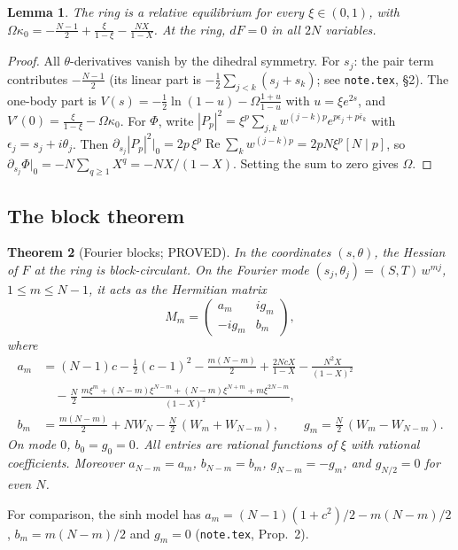 \documentclass[11pt]{article}
\newtheorem{theorem}{Theorem}
\newtheorem{lemma}[theorem]{Lemma}
\theoremstyle{remark}
\begin{document}
\begin{lemma}\label{lem:re}
The ring is a relative equilibrium for every $\xi\in(0,1)$, with
$\displaystyle \Omega\kappa_0=-\frac{N-1}2+\frac{\xi}{1-\xi}-\frac{NX}{1-X}$.
At the ring, $dF=0$ in all $2N$ variables.
\end{lemma}
\begin{proof}
All $\theta$-derivatives vanish by the dihedral symmetry. For $s_j$: the pair term contributes
$-\frac{N-1}2$ (its linear part is $-\frac12\sum_{j<k}(s_j+s_k)$; see \texttt{note.tex}, \S2). The one-body part is
$V(s)=-\frac12\ln(1-u)-\Omega\frac{1+u}{1-u}$ with $u=\xi e^{2s}$, and $V'(0)=\frac{\xi}{1-\xi}-\Omega\kappa_0$. For $\Phi$, write
$|P_p|^2=\xi^p\sum_{j,k}w^{(j-k)p}e^{p\epsilon_j+p\bar\epsilon_k}$ with $\epsilon_j=s_j+i\theta_j$. Then
$\partial_{s_j}|P_p|^2\big|_0=2p\,\xi^p\operatorname{Re}\sum_kw^{(j-k)p}=2pN\xi^p[N\mid p]$, so
$\partial_{s_j}\Phi|_0=-N\sum_{q\ge1}X^q=-NX/(1-X)$. Setting the sum to zero gives $\Omega$.
\end{proof}

\subsection{The block theorem}
\begin{theorem}[Fourier blocks; PROVED]\label{thm:blocks}
In the coordinates $(s,\theta)$, the Hessian of $F$ at the ring is block-circulant. On the Fourier mode
$(s_j,\theta_j)=(S,T)\,w^{mj}$, $1\le m\le N-1$, it acts as the Hermitian matrix
\[
M_m=\begin{pmatrix}a_m& i g_m\\ -ig_m& b_m\end{pmatrix},
\]
where
\begin{align*}
a_m&=(N-1)c-\tfrac12(c-1)^2-\tfrac{m(N-m)}2+\frac{2NcX}{1-X}-\frac{N^2X}{(1-X)^2}\\
&\quad-\frac N2\,\frac{m\xi^m+(N-m)\xi^{N-m}+(N-m)\xi^{N+m}+m\xi^{2N-m}}{(1-X)^2},\\
b_m&=\tfrac{m(N-m)}2+NW_N-\tfrac N2\,(W_m+W_{N-m}),\qquad
g_m=\tfrac N2\,(W_m-W_{N-m}).
\end{align*}
On mode $0$, $b_0=g_0=0$. All entries are rational functions of $\xi$ with rational coefficients. Moreover
$a_{N-m}=a_m$, $b_{N-m}=b_m$, $g_{N-m}=-g_m$, and $g_{N/2}=0$ for even $N$.
\end{theorem}
For comparison, the sinh model has $a_m=(N-1)(1+c^2)/2-m(N-m)/2$, $b_m=m(N-m)/2$ and $g_m=0$
(\texttt{note.tex}, Prop.~2).
\end{document}
